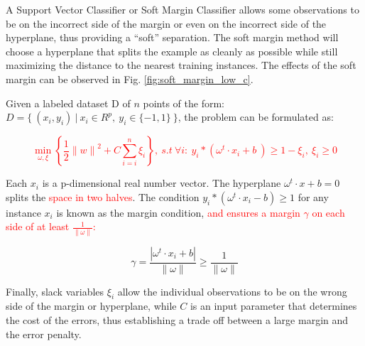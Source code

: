 A Support Vector Classifier or Soft Margin Classifier allows some observations to be on the
incorrect side of the margin or even on the incorrect side of the hyperplane, thus providing
a ``soft'' separation. The soft margin method will choose a hyperplane that splits the example
as cleanly as possible while still maximizing the distance to the nearest training instances.
The effects of the soft margin can be observed in Fig. \ref{fig:soft_margin_low_c}.

Given a labeled dataset D of $n$ points
of the form: $D=\{ \ (x_{i}, y_{i}) \ | \ x_{i} \in R^{p}, \ y_{i} \in \{-1, 1\} \ \}$, the
problem can be formulated as:




\textcolor{red}{
  \begin{equation}
    \displaystyle \min_{\omega, \xi} \left\{ \frac{1}{2}{\| w \|}^{2} + C \sum_{i=i}^{n}\xi_{i} \right\}, \ s.t \ \forall i: \
    y_{i}*(\omega^{t} \cdot x_{i} + b \ ) \geq 1 - \xi_{i}, \ \xi_{i} \geq 0
  \end{equation}
}

Each $x_{i}$ is a p-dimensional real number vector.
The hyperplane $\omega^{t} \cdot x + b = 0$ splits the \textcolor{red}{space in two halves}.
The condition $y_{i}*(\omega^{t} \cdot x_{i} - b) \geq 1$ for any instance $x_{i}$ is
known as the margin condition,
\textcolor{red}{
  and ensures a margin $\gamma$ on each side of at least
  $\frac{1}{\| \omega \|}$:
}

\begin{equation}
  \gamma = \frac{ |\omega^{t} \cdot x_{i} + b| }{ \| \omega \| } \geq \frac{1}{\| \omega \|}
\end{equation}

Finally, slack variables $\xi_{i}$ allow the individual observations to be
on the wrong side of the
margin or hyperplane, while $C$ is an input parameter that determines the cost of
the errors, thus establishing a trade off between a large margin and the error penalty.


